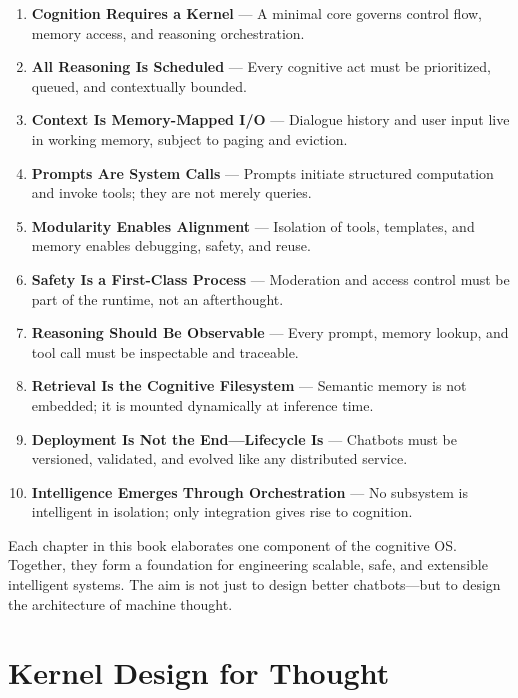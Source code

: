 \documentclass{book}
\begin{document}
\begin{enumerate}
  \item \textbf{Cognition Requires a Kernel} — A minimal core governs control flow, memory access, and reasoning orchestration.
  \item \textbf{All Reasoning Is Scheduled} — Every cognitive act must be prioritized, queued, and contextually bounded.
  \item \textbf{Context Is Memory-Mapped I/O} — Dialogue history and user input live in working memory, subject to paging and eviction.
  \item \textbf{Prompts Are System Calls} — Prompts initiate structured computation and invoke tools; they are not merely queries.
  \item \textbf{Modularity Enables Alignment} — Isolation of tools, templates, and memory enables debugging, safety, and reuse.
  \item \textbf{Safety Is a First-Class Process} — Moderation and access control must be part of the runtime, not an afterthought.
  \item \textbf{Reasoning Should Be Observable} — Every prompt, memory lookup, and tool call must be inspectable and traceable.
  \item \textbf{Retrieval Is the Cognitive Filesystem} — Semantic memory is not embedded; it is mounted dynamically at inference time.
  \item \textbf{Deployment Is Not the End—Lifecycle Is} — Chatbots must be versioned, validated, and evolved like any distributed service.
  \item \textbf{Intelligence Emerges Through Orchestration} — No subsystem is intelligent in isolation; only integration gives rise to cognition.
\end{enumerate}

Each chapter in this book elaborates one component of the cognitive OS. Together, they form a foundation for engineering scalable, safe, and extensible intelligent systems. The aim is not just to design better chatbots—but to design the architecture of machine thought.

\tableofcontents

\mainmatter %

\chapter{Kernel Design for Thought}
\end{document}
